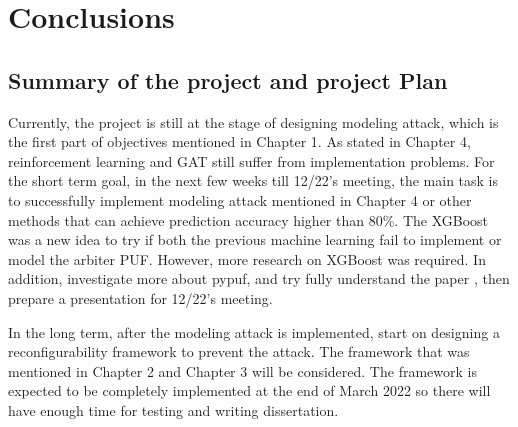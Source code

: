 \chapter{Conclusions}

\section{Summary of the project and project Plan}
Currently, the project is still at the stage of designing modeling attack, which is the first part of objectives mentioned in Chapter 1. As stated in Chapter 4, reinforcement learning and GAT still suffer from implementation problems. For the short term goal, in the next few weeks till 12/22's meeting,
the main task is to successfully implement modeling attack mentioned in Chapter 4 or other methods that can achieve prediction accuracy higher than 80\%. The XGBoost was a new idea to try if both the previous machine learning fail to implement or model the arbiter PUF. 
However, more research on XGBoost was required. In addition, investigate more about pypuf, and try fully understand the paper \cite{Reference11}, then prepare a presentation for 12/22's meeting.


In the long term, after the modeling attack is implemented, start on designing a reconfigurability framework to prevent the attack. The framework that was mentioned in Chapter 2 and Chapter 3 will be considered. The framework
is expected to be completely implemented at the end of March 2022 so there will have enough time for testing and writing dissertation.

